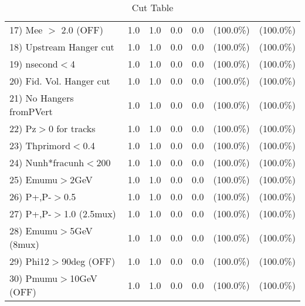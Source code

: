 \begin{table}[h!]
\begin{tabular}{||l||r|r|r|r|r|r||}
 17) Mee $>$ 2.0  (OFF)   &          1.0 &          1.0 &          0.0 &          0.0 & (100.0\%) & (100.0\%) \\
 18) Upstream Hanger cut  &          1.0 &          1.0 &          0.0 &          0.0 & (100.0\%) & (100.0\%) \\
 19) nsecond$<$4          &          1.0 &          1.0 &          0.0 &          0.0 & (100.0\%) & (100.0\%) \\
 20) Fid. Vol. Hanger cut &          1.0 &          1.0 &          0.0 &          0.0 & (100.0\%) & (100.0\%) \\
 21) No Hangers fromPVert &          1.0 &          1.0 &          0.0 &          0.0 & (100.0\%) & (100.0\%) \\
 22) Pz$>$0 for tracks    &          1.0 &          1.0 &          0.0 &          0.0 & (100.0\%) & (100.0\%) \\
 23) Thprimord$<$0.4      &          1.0 &          1.0 &          0.0 &          0.0 & (100.0\%) & (100.0\%) \\
 24) Nunh*fracunh$<$200   &          1.0 &          1.0 &          0.0 &          0.0 & (100.0\%) & (100.0\%) \\
 25) Emumu$>$2GeV         &          1.0 &          1.0 &          0.0 &          0.0 & (100.0\%) & (100.0\%) \\
 26) P+,P-$>$0.5          &          1.0 &          1.0 &          0.0 &          0.0 & (100.0\%) & (100.0\%) \\
 27) P+,P-$>$1.0 (2.5mux) &          1.0 &          1.0 &          0.0 &          0.0 & (100.0\%) & (100.0\%) \\
 28) Emumu$>$5GeV  (8mux) &          1.0 &          1.0 &          0.0 &          0.0 & (100.0\%) & (100.0\%) \\
 29) Phi12$>$90deg  (OFF) &          1.0 &          1.0 &          0.0 &          0.0 & (100.0\%) & (100.0\%) \\
 30) Pmumu$>$10GeV  (OFF) &          1.0 &          1.0 &          0.0 &          0.0 & (100.0\%) & (100.0\%) \\
 \hline
 \hline
 \end{tabular}
 \caption{Cut Table           }
 \label{tab-cutcohjpsi-mumu_cohrho0}
 \end{table}
